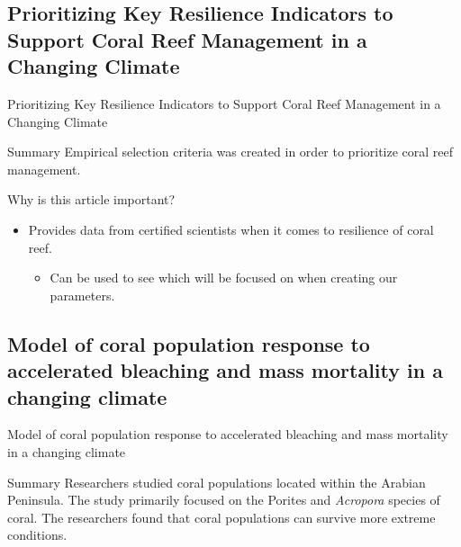 \documentclass{beamer}
\begin{document}
\subsection{Prioritizing Key Resilience Indicators to Support Coral Reef Management in a Changing Climate}
\begin{frame}{Prioritizing Key Resilience Indicators to Support Coral Reef Management in a Changing Climate}
    \begin{block}{Summary}
        Empirical selection criteria was created in order to prioritize coral reef management.
    \end{block}
    Why is this article important?
    \begin{itemize}
        \item Provides data from certified scientists when it comes to resilience of coral reef.
            \begin{itemize}
                \item Can be used to see which will be focused on when creating our parameters.
            \end{itemize}
    \end{itemize}
\end{frame}


\subsection{Model of coral population response to accelerated bleaching and mass
mortality in a changing climate}
\begin{frame}{Model of coral population response to accelerated bleaching and mass
mortality in a changing climate}
    \begin{block}{Summary}
        Researchers studied coral populations located within the Arabian Peninsula. The study primarily focused on the Porites and \textit{Acropora} species of coral. The researchers found that coral populations can survive more extreme conditions.
    \end{block}
\end{frame}
\end{document}
